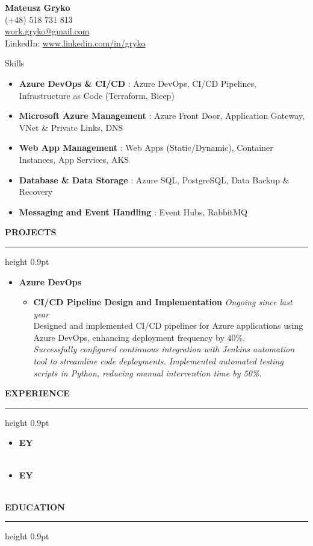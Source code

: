 \documentclass[11pt,letterpaper]{article}
\newcommand{\namesection}[2]{
    \begin{center}
        {\huge \bfseries #1}\\[-1pt]
        \small #2
    \end{center}\vspace{6pt}
}
\newenvironment{sectionheader}[1]{
    \vspace{6pt}\noindent\textbf{\uppercase{#1}}\vspace{1pt}\\[-2pt]
    \hrule height 0.9pt \vspace{3pt}
    \begin{itemize}[leftmargin=1.05em,itemsep=1pt,topsep=0pt]
}{
    \end{itemize}
}
\newenvironment{sectionheader_nobullet}[1]{
    \vspace{6pt}\noindent\textbf{\uppercase{#1}}\vspace{1pt}\\[-2pt]
    \hrule height 0.9pt \vspace{3pt}
    \begin{itemize}[leftmargin=0em,label={},itemsep=1pt,topsep=0pt]
}{
    \end{itemize}
}
\newenvironment{FitOnePage}
{%
  \newsavebox{\resumecontent}%
  \begin{lrbox}{\resumecontent}%
  \begin{minipage}{\textwidth}%
}
{%
  \end{minipage}%
  \end{lrbox}%
  \ifdim\ht\resumecontent>\textheight
    \begin{center}
      \adjustbox{max totalsize={\textwidth}{\textheight},center}{\usebox{\resumecontent}}
    \end{center}
  \else
    \usebox{\resumecontent}%
  \fi
}
\begin{document}
\begin{FitOnePage}\namesection{Mateusz Gryko}{%
(+48) 518 731 813 \\
\href{mailto:work.gryko@gmail.com}{work.gryko@gmail.com} \\
LinkedIn: \href{https://www.linkedin.com/in/gryko}{www.linkedin.com/in/gryko} \\
}
\begin{sectionheader_nobullet}{Skills}
\begin{itemize}[leftmargin=0em,label={},itemsep=0pt,topsep=0pt]
  \item \textbf{ Azure DevOps \& CI/CD }: Azure DevOps, CI/CD Pipelines, Infrastructure as Code (Terraform, Bicep)
  \item \textbf{ Microsoft Azure Management }: Azure Front Door, Application Gateway, VNet \& Private Links, DNS
  \item \textbf{ Web App Management }: Web Apps (Static/Dynamic), Container Instances, App Services, AKS
  \item \textbf{ Database \& Data Storage }: Azure SQL, PostgreSQL, Data Backup \& Recovery
  \item \textbf{ Messaging and Event Handling }: Event Hubs, RabbitMQ
\end{itemize}
\end{sectionheader_nobullet}\begin{sectionheader}{Projects}
  \item \textbf{ Azure DevOps }
  \begin{itemize}[leftmargin=1em,itemsep=1pt,topsep=1pt]
      \item \textbf{ CI/CD Pipeline Design and Implementation } \hfill {\emph{ Ongoing since last year }} \\
            {\small Designed and implemented CI/CD pipelines for Azure applications using Azure DevOps, enhancing deployment frequency by 40\%.} \\[-2pt]
            {\footnotesize \emph{ Successfully configured continuous integration with Jenkins automation tool to streamline code deployments. Implemented automated testing scripts in Python, reducing manual intervention time by 50\%. }}
  \end{itemize}
\end{sectionheader}\begin{sectionheader}{Experience}
  \item \textbf{ EY } \hfill {\emph{  }}\\[-1pt]
        {\small }\\[-2pt]
        {\footnotesize }
  \item \textbf{ EY } \hfill {\emph{  }}\\[-1pt]
        {\small }\\[-2pt]
        {\footnotesize }
\end{sectionheader}\begin{sectionheader}{Education}
\end{sectionheader}\end{FitOnePage}
\end{document}
